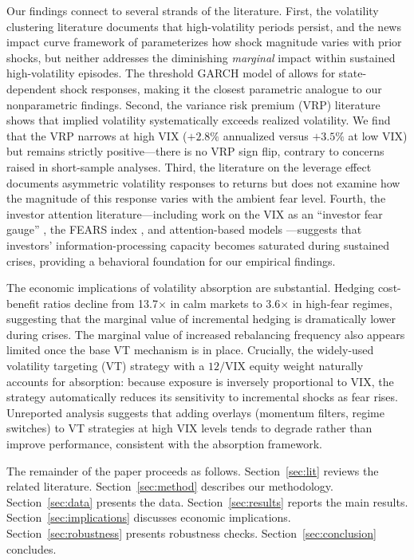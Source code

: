 \documentclass[12pt,a4paper]{article}
\begin{document}
Our findings connect to several strands of the literature. First, the volatility clustering literature \citep{engle1982, bollerslev1986} documents that high-volatility periods persist, and the news impact curve framework of \citet{engle1993} parameterizes how shock magnitude varies with prior shocks, but neither addresses the diminishing \textit{marginal} impact within sustained high-volatility episodes. The threshold GARCH model of \citet{zakoian1994} allows for state-dependent shock responses, making it the closest parametric analogue to our nonparametric findings. Second, the variance risk premium (VRP) literature \citep{bollerslev2009, carr2009, todorov2010} shows that implied volatility systematically exceeds realized volatility. We find that the VRP narrows at high VIX ($+2.8\%$ annualized versus $+3.5\%$ at low VIX) but remains strictly positive---there is no VRP sign flip, contrary to concerns raised in short-sample analyses. Third, the literature on the leverage effect \citep{black1976, christie1982} documents asymmetric volatility responses to returns but does not examine how the magnitude of this response varies with the ambient fear level. Fourth, the investor attention literature---including work on the VIX as an ``investor fear gauge'' \citep{whaley2000}, the FEARS index \citep{da2015}, and attention-based models \citep{andrei2015}---suggests that investors' information-processing capacity becomes saturated during sustained crises, providing a behavioral foundation for our empirical findings.

The economic implications of volatility absorption are substantial. Hedging cost-benefit ratios decline from 13.7$\times$ in calm markets to 3.6$\times$ in high-fear regimes, suggesting that the marginal value of incremental hedging is dramatically lower during crises. The marginal value of increased rebalancing frequency also appears limited once the base VT mechanism is in place. Crucially, the widely-used volatility targeting (VT) strategy with a $12/\text{VIX}$ equity weight naturally accounts for absorption: because exposure is inversely proportional to VIX, the strategy automatically reduces its sensitivity to incremental shocks as fear rises. Unreported analysis suggests that adding overlays (momentum filters, regime switches) to VT strategies at high VIX levels tends to degrade rather than improve performance, consistent with the absorption framework.

The remainder of the paper proceeds as follows. Section~\ref{sec:lit} reviews the related literature. Section~\ref{sec:method} describes our methodology. Section~\ref{sec:data} presents the data. Section~\ref{sec:results} reports the main results. Section~\ref{sec:implications} discusses economic implications. Section~\ref{sec:robustness} presents robustness checks. Section~\ref{sec:conclusion} concludes.
\end{document}
